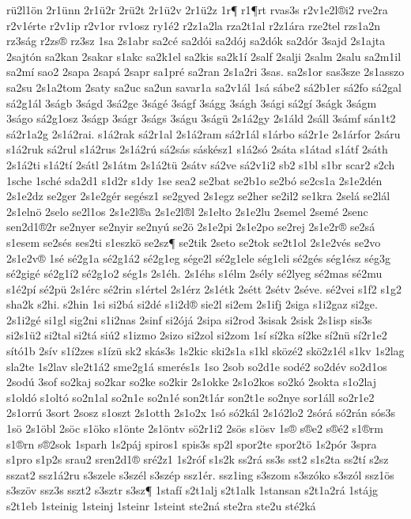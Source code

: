{rü2l1ön
2r1ünn
2r1ü2r
2rü2t
2r1ü2v
2r1ü2z
1r¶
r1¶rt
rvas3s
r2v1e2l®i2
rve2ra
r2v1érte
r2v1ip
r2v1or
rv1osz
ry1é2
r2z1a2la
rza2t1al
r2z1ára
rze2tel
rzs1a2n
rz3ság
r2zs®
rz3sz
1sa
2s1abr
sa2cé
sa2dói
sa2dój
sa2dók
sa2dór
3sajd
2s1ajta
2sajtón
sa2kan
2sakar
s1akc
sa2k1el
sa2kis
sa2k1í
2salf
2salji
2salm
2salu
sa2m1il
sa2mí
sao2
2sapa
2sapá
2sapr
sa1pré
sa2ran
2s1a2ri
3sas.
sa2s1or
sas3sze
2s1asszo
sa2su
2s1a2tom
2saty
sa2uc
sa2un
savar1a
sa2v1ál
1sá
sábe2
sá2b1er
sá2fo
sá2gal
sá2g1ál
3ságb
3ságd
3sá2ge
3ságé
3ságf
3ságg
3ságh
3sági
sá2gí
3ságk
3ságm
3ságo
sá2g1osz
3ságp
3ságr
3ságs
3ságu
3ságü
2s1á2gy
2s1áld
2sáll
3sámf
sán1t2
sá2r1a2g
2s1á2rai.
s1á2rak
sá2r1al
2s1á2ram
sá2r1ál
s1árbo
sá2r1e
2s1árfor
2sáru
s1á2ruk
sá2rul
s1á2rus
2s1á2rú
sá2sás
sáskész1
s1á2só
2sáta
s1átad
s1átf
2sáth
2s1á2ti
s1á2tí
2sátl
2s1átm
2s1á2tü
2sátv
sá2ve
sá2v1i2
sb2
s1bl
s1br
scar2
s2ch
1sche
1sché
sda2d1
s1d2r
s1dy
1se
sea2
se2bat
se2b1o
se2bó
se2cs1a
2s1e2dén
2s1e2dz
se2ger
2s1e2gér
segész1
se2gyed
2s1egz
se2her
se2il2
se1kra
2selá
se2lál
2s1elnö
2selo
se2l1os
2s1e2l®a
2s1e2l®l
2s1elto
2s1e2lu
2semel
2semé
2senc
sen2d1®2r
se2nyer
se2nyir
se2nyú
se2ö
2s1e2pi
2s1e2po
se2rej
2s1e2r®
se2sá
s1esem
se2sés
ses2ti
s1eszkö
se2sz¶
se2tik
2seto
se2tok
se2t1ol
2s1e2vés
se2vo
2s1e2v®
1sé
sé2g1a
sé2g1á2
sé2g1eg
sége2l
sé2g1ele
ség1eli
sé2gés
ség1ész
ség3g
sé2gigé
sé2g1í2
sé2g1o2
ség1s
2s1éh.
2s1éhs
s1élm
2sély
sé2lyeg
sé2mas
sé2mu
s1é2pí
sé2pü
2s1érc
sé2rin
s1értel
2s1érz
2s1étk
2sétt
2sétv
2séve.
sé2vei
s1f2
s1g2
sha2k
s2hi.
s2hin
1si
si2bá
si2dé
s1i2d®
sie2l
si2em
2s1ifj
2siga
s1i2gaz
si2ge.
2s1i2gé
si1gl
sig2ni
s1i2nas
2sinf
si2ójá
2sipa
si2rod
3sisak
2sisk
2s1isp
sis3s
si2s1ü2
si2tal
si2tá
siú2
s1izmo
2sizo
si2zol
si2zom
1sí
sí2ka
sí2ke
sí2nü
sí2r1e2
sító1b
2sív
s1í2zes
s1ízü
sk2
skás3s
1s2kic
ski2s1a
s1kl
sközé2
skö2z1él
s1kv
1s2lag
sla2te
1s2lav
sle2t1á2
sme2g1á
smerés1s
1so
2sob
so2d1e
sodé2
so2dév
so2d1os
2sodú
3sof
so2kaj
so2kar
so2ke
so2kir
2s1okke
2s1o2kos
so2kó
2sokta
s1o2laj
s1oldó
s1oltó
so2n1al
so2n1e
so2n1é
son2t1ár
son2t1e
so2nye
sor1áll
so2r1e2
2s1orrú
3sort
2sosz
s1oszt
2s1otth
2s1o2x
1só
só2kál
2s1ó2lo2
2sórá
só2rán
sós3s
1sö
2s1öbl
2söc
s1öko
s1önte
2s1öntv
sö2r1i2
2sös
s1ösv
1s®
s®e2
s®é2
s1®rm
s1®rn
s®2sok
1sparh
1s2páj
spiros1
spis3s
sp2l
spor2te
spor2tö
1s2pór
3spra
s1pro
s1p2s
srau2
sren2d1®
sré2z1
1s2róf
s1s2k
ss2rá
ss3s
sst2
s1s2ta
ss2tí
s2sz
sszat2
ssz1á2ru
s3szele
s3szél
s3szép
ssz1ér.
ssz1ing
s3szom
s3szóko
s3szól
ssz1ös
s3szöv
ssz3s
sszt2
s3sztr
s3sz¶
1stafí
s2t1alj
s2t1alk
1stansan
s2t1a2rá
1stájg
s2t1eb
1steinig
1steinj
1steinr
1steint
ste2ná
ste2ra
ste2u
sté2ká
}
